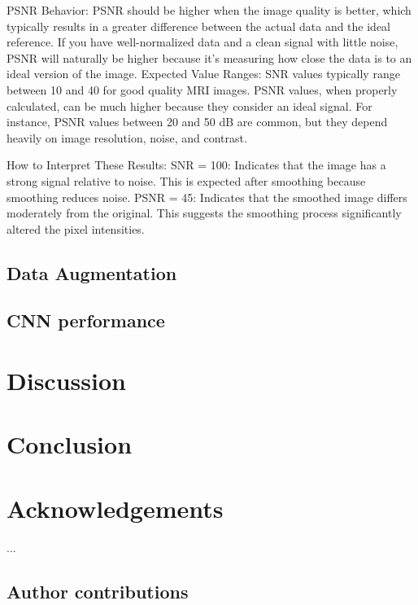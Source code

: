 PSNR Behavior:
PSNR should be higher when the image quality is better, which typically results in a greater difference between the actual data and the ideal reference.
If you have well-normalized data and a clean signal with little noise, PSNR will naturally be higher because it’s measuring how close the data is to an ideal version of the image.
Expected Value Ranges:
SNR values typically range between 10 and 40 for good quality MRI images.
PSNR values, when properly calculated, can be much higher because they consider an ideal signal. For instance, PSNR values between 20 and 50 dB are common, but they depend heavily on image resolution, noise, and contrast.

How to Interpret These Results:
SNR = 100: Indicates that the image has a strong signal relative to noise. This is expected after smoothing because smoothing reduces noise.
PSNR = 45: Indicates that the smoothed image differs moderately from the original. This suggests the smoothing process significantly altered the pixel intensities.

\subsection{Data Augmentation}

\subsection{CNN performance}

\lipsum[5-6]

\section{Discussion}

\lipsum[7-8]

\section{Conclusion}

\lipsum[9-10]



\section*{Acknowledgements}

...

\subsection*{Author contributions}

